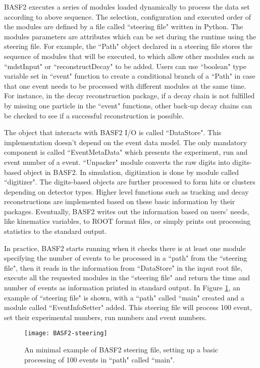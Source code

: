 BASF2 executes a series of modules loaded dynamically to process the data set according to above sequence. The selection, configuration and executed order of the modules are defined by a file called ``steering file" written in Python. The modules parameters are attributes which can be set during the runtime using the steering file. For example, the ``Path" object declared in a steering file stores the sequence of modules that will be executed, to which allow other modules such as ``mdstInput" or ``reconstructDecay" to be added.
Users can use ``boolean" type variable set in ``event" function to create a conditional branch of a ``Path" in case that one event needs to be processed with different modules at the same time. For instance, in the decay reconstruction package, if a decay chain is not fulfilled by missing one particle in the ``event" functions, other back-up decay chains can be checked to see if a successful reconstruction is possible.  

The object that interacts with BASF2 I/O is called ``DataStore". This implementation doesn't depend on the event data model. The only mandatory component is called ``EventMetaData" which presents the experiment, run  and event number of a event. ``Unpacker" module converts the raw digits into digits-based object in BASF2. In simulation, digitization is done by module called ``digitizer". The digits-based objects are further processed to form hits or clusters depending on detector types. Higher level functions such as tracking and decay reconstructions are implemented based on these basic information by their packages. Eventually, BASF2 writes out the information based on users' needs, like kinematics variables, to ROOT\cite{ROOTcern} format files, or simply prints out processing statistics to the standard output.

 In practice, BASF2 starts running when it checks there is at least one module specifying the number of events to be processed in a ``path"  from the ``steering file", then it reads in the information from ``DataStore" in the input root file, execute all the requested modules in the ``steering file" and return the time and number of events as information printed in standard output. In Figure  \ref{fig:basf2_eg}, an example of ``steering file" is shown, with a ``path" called ``main" created and a module called ``EventInfoSetter" added. This steering file will process 100 event, set their experimental numbers, run numbers and event numbers.

\begin{figure}[htbp]
	\centering
	\texttt{[image: BASF2-steering]}
	\caption{ An minimal example of BASF2 steering file, setting up a basic processing of 100 events in ``path" called ``main". }
	\label{fig:basf2_eg}
\end{figure}





